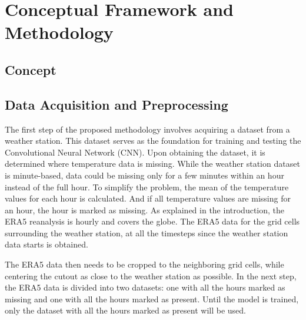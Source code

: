 \section{Conceptual Framework and Methodology}
\label{sec:design}

\subsection{Concept}

\begin{figure}
    
\end{figure}

\subsection{Data Acquisition and Preprocessing}
The first step of the proposed methodology involves acquiring a dataset from a weather station. This dataset serves as the foundation for training and testing the Convolutional Neural Network (CNN). Upon obtaining the dataset, it is determined where temperature data is missing. While the weather station dataset is minute-based, data could be missing only for a few minutes within an hour instead of the full hour. To simplify the problem, the mean of the temperature values for each hour is calculated. And if all temperature values are missing for an hour, the hour is marked as missing. As explained in the introduction, the ERA5 reanalysis is hourly and covers the globe. The ERA5 data for the grid cells surrounding the weather station, at all the timesteps since the weather station data starts is obtained.

The ERA5 data then needs to be cropped to the neighboring grid cells, while centering the cutout as close to the weather station as possible. In the next step, the ERA5 data is divided into two datasets: one with all the hours marked as missing and one with all the hours marked as present. Until the model is trained, only the dataset with all the hours marked as present will be used.


